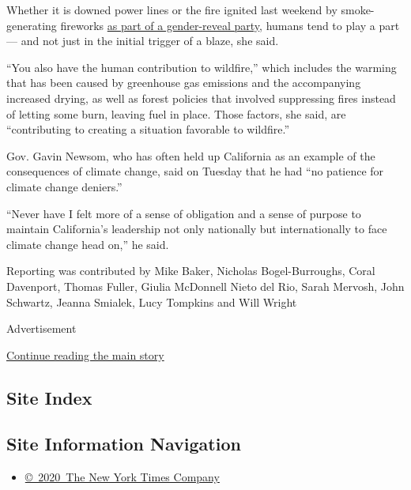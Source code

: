 Whether it is downed power lines or the fire ignited last weekend by
smoke-generating fireworks
\href{https://www.nytimes3xbfgragh.onion/2020/09/07/us/gender-reveal-party-wildfire.html}{as
part of a gender-reveal party}, humans tend to play a part --- and not
just in the initial trigger of a blaze, she said.

``You also have the human contribution to wildfire,'' which includes the
warming that has been caused by greenhouse gas emissions and the
accompanying increased drying, as well as forest policies that involved
suppressing fires instead of letting some burn, leaving fuel in place.
Those factors, she said, are ``contributing to creating a situation
favorable to wildfire.''

Gov. Gavin Newsom, who has often held up California as an example of the
consequences of climate change, said on Tuesday that he had ``no
patience for climate change deniers.''

``Never have I felt more of a sense of obligation and a sense of purpose
to maintain California's leadership not only nationally but
internationally to face climate change head on,'' he said.

Reporting was contributed by Mike Baker, Nicholas Bogel-Burroughs, Coral
Davenport, Thomas Fuller, Giulia McDonnell Nieto del Rio, Sarah Mervosh,
John Schwartz, Jeanna Smialek, Lucy Tompkins and Will Wright

Advertisement

\protect\hyperlink{after-bottom}{Continue reading the main story}

\hypertarget{site-index}{%
\subsection{Site Index}\label{site-index}}

\hypertarget{site-information-navigation}{%
\subsection{Site Information
Navigation}\label{site-information-navigation}}

\begin{itemize}
\tightlist
\item
  \href{https://help.nytimes3xbfgragh.onion/hc/en-us/articles/115014792127-Copyright-notice}{©~2020~The
  New York Times Company}
\end{itemize}

